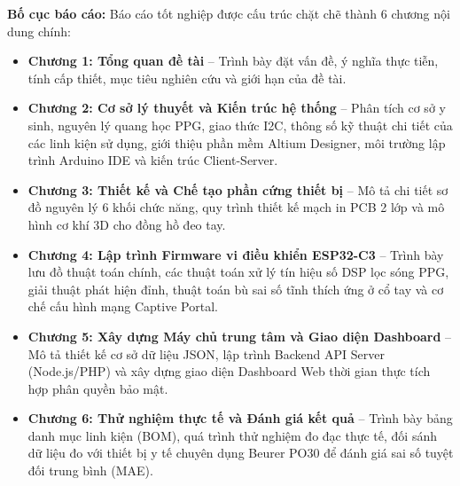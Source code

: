 \textbf{Bố cục báo cáo:} 
Báo cáo tốt nghiệp được cấu trúc chặt chẽ thành 6 chương nội dung chính:
\begin{itemize}
    \item \textbf{Chương 1: Tổng quan đề tài} -- Trình bày đặt vấn đề, ý nghĩa thực tiễn, tính cấp thiết, mục tiêu nghiên cứu và giới hạn của đề tài.
    \item \textbf{Chương 2: Cơ sở lý thuyết và Kiến trúc hệ thống} -- Phân tích cơ sở y sinh, nguyên lý quang học PPG, giao thức I2C, thông số kỹ thuật chi tiết của các linh kiện sử dụng, giới thiệu phần mềm Altium Designer, môi trường lập trình Arduino IDE và kiến trúc Client-Server.
    \item \textbf{Chương 3: Thiết kế và Chế tạo phần cứng thiết bị} -- Mô tả chi tiết sơ đồ nguyên lý 6 khối chức năng, quy trình thiết kế mạch in PCB 2 lớp và mô hình cơ khí 3D cho đồng hồ đeo tay.
    \item \textbf{Chương 4: Lập trình Firmware vi điều khiển ESP32-C3} -- Trình bày lưu đồ thuật toán chính, các thuật toán xử lý tín hiệu số DSP lọc sóng PPG, giải thuật phát hiện đỉnh, thuật toán bù sai số tĩnh thích ứng ở cổ tay và cơ chế cấu hình mạng Captive Portal.
    \item \textbf{Chương 5: Xây dựng Máy chủ trung tâm và Giao diện Dashboard} -- Mô tả thiết kế cơ sở dữ liệu JSON, lập trình Backend API Server (Node.js/PHP) và xây dựng giao diện Dashboard Web thời gian thực tích hợp phân quyền bảo mật.
    \item \textbf{Chương 6: Thử nghiệm thực tế và Đánh giá kết quả} -- Trình bày bảng danh mục linh kiện (BOM), quá trình thử nghiệm đo đạc thực tế, đối sánh dữ liệu đo với thiết bị y tế chuyên dụng Beurer PO30 để đánh giá sai số tuyệt đối trung bình (MAE).
\end{itemize}
